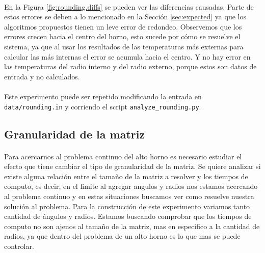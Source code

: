 \documentclass[12pt]{article}
\begin{document}
\paragraph{} En la Figura \ref{fig:rounding.diffs} se pueden ver las diferencias causadas. Parte de estos errores se deben a lo mencionado en la Sección \ref{sec:expected} ya que los algoritmos propuestos tienen un leve error de redondeo. Observemos que los errores crecen hacia el centro del horno, esto sucede por cómo se resuelve el sistema, ya que al usar los resultados de las temperaturas más externas para calcular las más internas el error se acumula hacia el centro. Y no hay error en las temperaturas del radio interno y del radio externo, porque estos son datos de entrada y no calculados.

\paragraph{} Este experimento puede ser repetido modificando la entrada en \texttt{data/rounding.in} y corriendo el script \texttt{analyze\_rounding.py}.


\subsection{Granularidad de la matriz}

\paragraph{} Para acercarnos al problema continuo del alto horno es necesario estudiar el efecto que tiene cambiar el tipo de granularidad de la matriz. Se quiere analizar si existe alguna relación entre el tamaño de la matriz a resolver y los tiempos de computo, es decir, en el limite al agregar angulos y radios nos estamos acercando al problema continuo y en estas situaciones buscamos ver como resuelve nuestra solución al problema. Para la construcción de este experimento variamos tanto cantidad de ángulos y radios. Estamos buscando comprobar que los tiempos de computo no son ajenos al tamaño de la matriz, mas en especifico a la cantidad de radios, ya que dentro del problema de un alto horno es lo que mas se puede controlar. 
\end{document}
